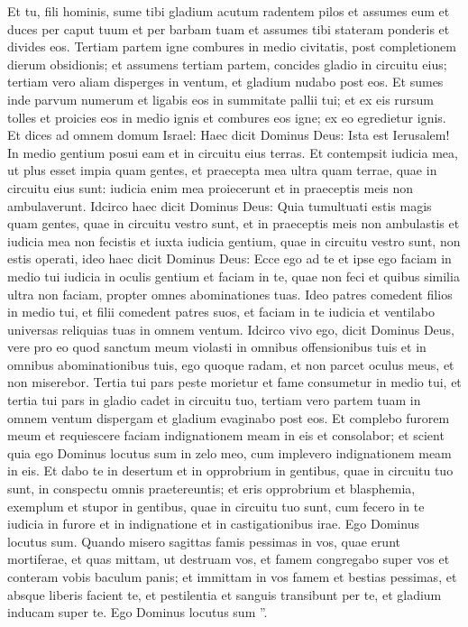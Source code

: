 \begin{biblechapter}
\begin{biblechapter}
\begin{biblechapter}
\begin{biblechapter}
\begin{biblechapter}
\verse Et tu, fili hominis, sume tibi gladium acutum radentem pilos et assumes eum et duces per caput tuum et per barbam tuam et assumes tibi stateram ponderis et divides eos. 
\verse Tertiam partem igne combures in medio civitatis, post completionem dierum obsidionis; et assumens tertiam partem, concides gladio in circuitu eius; tertiam vero aliam disperges in ventum, et gladium nudabo post eos. 
\verse Et sumes inde parvum numerum et ligabis eos in summitate pallii tui; 
 \verse et ex eis rursum tolles et proicies eos in medio ignis et combures eos igne; ex eo egredietur ignis. Et dices ad omnem domum Israel:
 \verse Haec dicit Dominus Deus: Ista est Ierusalem! In medio gentium posui eam et in circuitu eius terras. 
\verse Et contempsit iudicia mea, ut plus esset impia quam gentes, et praecepta mea ultra quam terrae, quae in circuitu eius sunt: iudicia enim mea proiecerunt et in praeceptis meis non ambulaverunt.
 \verse Idcirco haec dicit Dominus Deus: Quia tumultuati estis magis quam gentes, quae in circuitu vestro sunt, et in praeceptis meis non ambulastis et iudicia mea non fecistis et iuxta iudicia gentium, quae in circuitu vestro sunt, non estis operati, 
\verse ideo haec dicit Dominus Deus: Ecce ego ad te et ipse ego faciam in medio tui iudicia in oculis gentium 
\verse et faciam in te, quae non feci et quibus similia ultra non faciam, propter omnes abominationes tuas. 
\verse Ideo patres comedent filios in medio tui, et filii comedent patres suos, et faciam in te iudicia et ventilabo universas reliquias tuas in omnem ventum. 
\verse Idcirco vivo ego, dicit Dominus Deus, vere pro eo quod sanctum meum violasti in omnibus offensionibus tuis et in omnibus abominationibus tuis, ego quoque radam, et non parcet oculus meus, et non miserebor. 
\verse Tertia tui pars peste morietur et fame consumetur in medio tui, et tertia tui pars in gladio cadet in circuitu tuo, tertiam vero partem tuam in omnem ventum dispergam et gladium evaginabo post eos. 
\verse Et complebo furorem meum et requiescere faciam indignationem meam in eis et consolabor; et scient quia ego Dominus locutus sum in zelo meo, cum implevero indignationem meam in eis. 
\verse Et dabo te in desertum et in opprobrium in gentibus, quae in circuitu tuo sunt, in conspectu omnis praetereuntis; 
\verse et eris opprobrium et blasphemia, exemplum et stupor in gentibus, quae in circuitu tuo sunt, cum fecero in te iudicia in furore et in indignatione et in castigationibus irae. 
\verse Ego Dominus locutus sum. Quando misero sagittas famis pessimas in vos, quae erunt mortiferae, et quas mittam, ut destruam vos, et famem congregabo super vos et conteram vobis baculum panis; 
 \verse et immittam in vos famem et bestias pessimas, et absque liberis facient te, et pestilentia et sanguis transibunt per te, et gladium inducam super te. Ego Dominus locutus sum ”.
 

\end{biblechapter}
\end{biblechapter}
\end{biblechapter}
\end{biblechapter}
\end{biblechapter}
